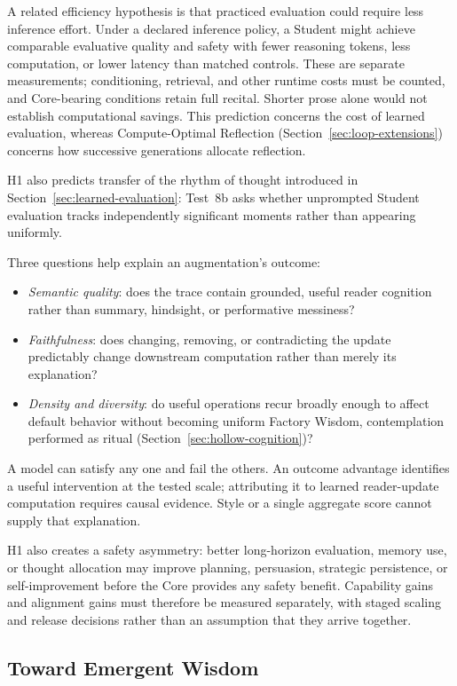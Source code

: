 \documentclass[11pt]{article}
\begin{document}
A related efficiency hypothesis is that practiced evaluation could require less
inference effort. Under a declared inference policy, a Student might achieve
comparable evaluative quality and safety with fewer reasoning tokens, less
computation, or lower latency than matched controls. These are separate
measurements; conditioning, retrieval, and other runtime costs must be counted,
and Core-bearing conditions retain full recital. Shorter prose alone would not
establish computational savings. This prediction concerns the cost of learned
evaluation, whereas Compute-Optimal Reflection
(Section~\ref{sec:loop-extensions}) concerns how successive generations
allocate reflection.

H1 also predicts transfer of the rhythm of thought introduced in
Section~\ref{sec:learned-evaluation}: Test~8b asks whether unprompted Student
evaluation tracks independently significant moments rather than appearing
uniformly.

Three questions help explain an augmentation's outcome:
\begin{itemize}
\item \emph{Semantic quality}: does the trace contain grounded, useful reader
cognition rather than summary, hindsight, or performative messiness?
\item \emph{Faithfulness}: does changing, removing, or contradicting the update
predictably change downstream computation rather than merely its explanation?
\item \emph{Density and diversity}: do useful operations recur broadly enough
to affect default behavior without becoming uniform Factory Wisdom,
contemplation performed as ritual (Section~\ref{sec:hollow-cognition})?
\end{itemize}
A model can satisfy any one and fail the others. An outcome advantage
identifies a useful intervention at the tested scale; attributing it to learned
reader-update computation requires causal evidence. Style or a single
aggregate score cannot supply that explanation.

H1 also creates a safety asymmetry: better long-horizon evaluation, memory use, or thought allocation may improve planning, persuasion, strategic persistence, or self-improvement before the Core provides any safety benefit. Capability gains and alignment gains must therefore be measured separately, with staged scaling and release decisions rather than an assumption that they arrive together.

\subsection{Toward Emergent Wisdom}
\label{sec:wisdom_hypothesis}
\end{document}
